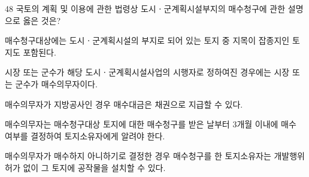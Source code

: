 \begin{question}{48}
국토의 계획 및 이용에 관한 법령상 도시ㆍ군계획시설부지의 매수청구에 관한 설명으로 옳은 것은?
\begin{choices}
  \item 매수청구대상에는 도시ㆍ군계획시설의 부지로 되어 있는 토지 중 지목이 잡종지인 토지도 포함된다.
  \item 시장 또는 군수가 해당 도시ㆍ군계획시설사업의 시행자로 정하여진 경우에는 시장 또는 군수가 매수의무자이다.
  \item 매수의무자가 지방공사인 경우 매수대금은 채권으로 지급할 수 있다.
  \item 매수의무자는 매수청구대상 토지에 대한 매수청구를 받은 날부터 3개월 이내에 매수 여부를 결정하여 토지소유자에게 알려야 한다.
  \item 매수의무자가 매수하지 아니하기로 결정한 경우 매수청구를 한 토지소유자는 개발행위허가 없이 그 토지에 공작물을 설치할 수 있다.
\end{choices}
\end{question}
